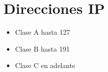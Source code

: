 \chapter{Direcciones IP}    

\begin{itemize}
    \item Clase A hasta 127
    \item Clase B hasta 191
    \item Clase C en adelante
\end{itemize}